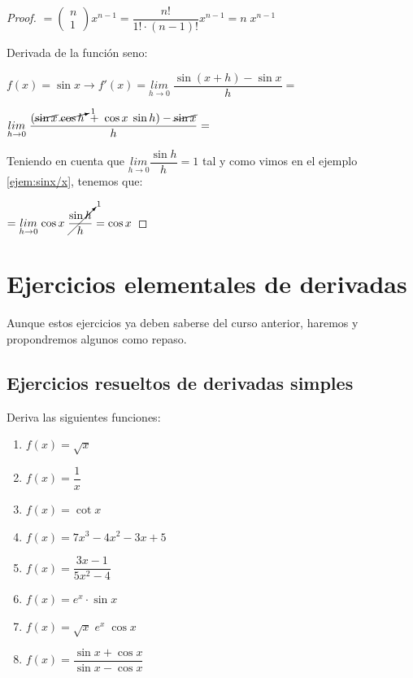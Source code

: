 \begin{proof}
	$ = \left( \begin{matrix} n \\ 1 \end{matrix} \right) x^{n-1}= \dfrac {n!}{1!\cdot (n-1)!}x^{n-1}=n\; x^{n-1}$
	
	\vspace{4mm}Derivada de la función seno:
	
	$f(x)=\sin x \to f'(x)=\underset{h\to 0}{lim}\;{\dfrac {\sin(x+h)-\sin x}{h}}=  $
	
	$\underset{h\to 0}{lim}\;{\dfrac {(\cancel{\sin x} \; \cancelto{1}{\cos h} \; + \; \cos x\; \sin h)-\cancel{\sin x}}{h}}=$

	Teniendo en cuenta que $\underset {h\to 0}{lim}{\dfrac {\sin h}{h}}=1$ tal y como vimos en el ejemplo \ref{ejem:sinx/x}, tenemos que:	
	
	$=\underset{h\to 0}{lim}\;{\cos x \; \cancelto{1}{ \dfrac {\sin h}{h}} }=\cos x$
		
	\end{proof}
	
	
		\section{Ejercicios elementales de derivadas}
	
	Aunque estos ejercicios ya deben saberse del curso anterior, haremos y propondremos algunos como repaso.
	
	\subsection{Ejercicios resueltos de derivadas simples}
	
	
	\begin{ejre} Deriva las siguientes funciones:
	
	\begin{multicols}{2}
	
	\begin{enumerate}
		\item $f(x)=\sqrt x$
		\item $f(x)=\dfrac 1 x$
		\item $f(x)=\cot x$
		\item $f(x)=7x^3-4x^2-3x+5$
		\item $f(x)=\dfrac {3x-1}{5x^2-4}$
		\item $f(x)=e^x\cdot \sin x$
		\item $f(x)=\sqrt{x}\; e^x\; \cos x$
		\item $f(x)=\dfrac {\sin x + \cos x}{\sin x - \cos x}$
	\end{enumerate}
		
	\end{multicols}

		
	\end{ejre}
	
